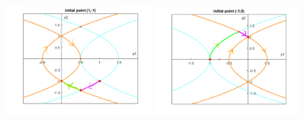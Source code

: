 \documentclass[12pt]{article}
\begin{document}
\begin{problem}[3]
\begin{enumerate}[label=(\alph*)]
\begin{figure}[H]
	\includegraphics[width=0.49\textwidth]{./figures/6.13.png}
	\includegraphics[width=0.49\textwidth]{./figures/6.14.png}
\end{figure}
\end{enumerate}
\end{problem}

\begin{problem}[4]

\end{problem}
\end{document}
